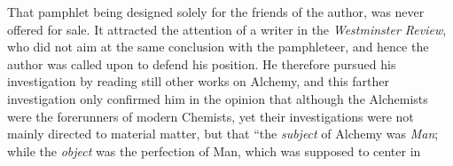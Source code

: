 That pamphlet being designed solely for the friends of the author, was
never offered for sale. It attracted the attention of a writer in the
\emph{Westminster Review}, who did not aim at the same conclusion with
the pamphleteer, and hence the author was called upon to defend his
position. He therefore pursued his investigation by reading still
other works on Alchemy, and this farther investigation only confirmed
him in the opinion that although the Alchemists were the forerunners
of modern Chemists, yet their investigations were not mainly directed
to material matter, but that ``the \emph{subject} of Alchemy was \emph{Man}; while
the \emph{object} was the perfection of Man, which was supposed to center in\endinput
